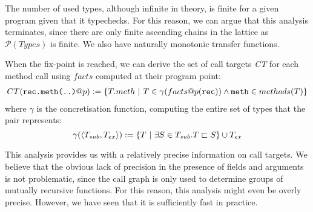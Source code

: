 The number of used types, although infinite in theory, is finite for a given
program given that it typechecks. For this reason, we can argue that this
analysis terminates, since there are only finite ascending chains in the
lattice as $\mathcal{P}(Types)$ is finite. We also have naturally monotonic
transfer functions.

When the fix-point is reached, we can derive the set of call targets \emph{CT}
for each method call using $facts$ computed at their program point:
\begin{eqnarray*}
    CT(\verb/rec.meth(..)/ @ p) := \{ T.meth ~|~ T \in \gamma(facts@p(\verb/rec/)) \land \verb/meth/ \in methods(T) \}
\end{eqnarray*}
where $\gamma$ is the concretisation function, computing the entire set of
types that the pair represents:
$$
\gamma(\langle T_{sub}, T_{ex} \rangle ) := \{ T ~|~ \exists S \in T_{sub}. T \sqsubset S\} \cup T_{ex}
$$

This analysis provides us with a relatively precise information on call
targets. We believe that the obvious lack of precision in the presence of
fields and arguments is not problematic, since the call graph is only used to
determine groups of mutually recursive functions. For this reason, this
analysis might even be overly precise. However, we have seen that it is
sufficiently fast in practice.
